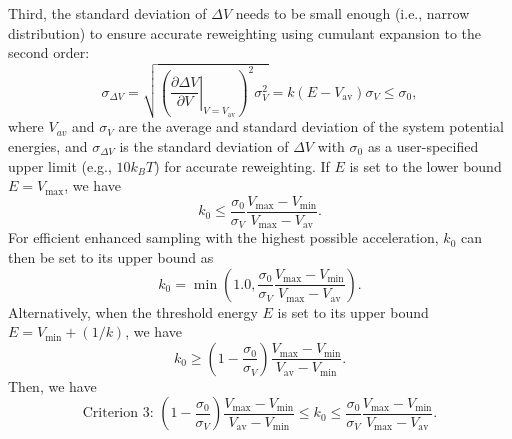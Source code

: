 Third, the standard deviation of $\Delta V$ needs to be small enough (i.e., narrow distribution) to ensure accurate reweighting using cumulant expansion to the second order:\cite{MiaoJCTC2014}
\begin{equation}
	\sigma_{\Delta V}=\sqrt{\left(\left.\frac{\partial \Delta V}{\partial V}\right|_{V=V_{\mathrm{av}}}\right)^{2} \sigma_{V}^{2}}=k\left(E-V_{\mathrm{av}}\right) \sigma_{V} \leq \sigma_{0},
\end{equation}
where $V_{av}$ and $\sigma_{V}$ are the average and standard deviation of the system potential energies, and $\sigma_{\Delta V}$ is the standard deviation of $\Delta V$ with $\sigma_{0}$ as a user-specified upper limit (e.g., $10k_BT$) for accurate reweighting. If $E$ is set to the lower bound $E=V_{\mathrm{max}}$, we have
\begin{equation}
	k_{0} \leq \frac{\sigma_{0}}{\sigma_{V}} \frac{V_{\max }-V_{\min }}{V_{\max }-V_{\mathrm{av}}}.
\end{equation}
For efficient enhanced sampling with the highest possible acceleration, $k_0$ can then be set to its upper bound as
\begin{equation}
	k_{0}=\min \left(1.0, \frac{\sigma_{0}}{\sigma_{V}} \frac{V_{\max }-V_{\min }}{V_{\max }-V_{\mathrm{av}}}\right).
\end{equation}
Alternatively, when the threshold energy $E$ is set to its upper bound $E = V_{\mathrm{min}} + (1/k)$, we have
\begin{equation}
	k_{0} \geq\left(1-\frac{\sigma_{0}}{\sigma_{V}}\right) \frac{V_{\max }-V_{\min }}{V_{\mathrm{av}}-V_{\min }}.
\end{equation}
Then, we have
\begin{equation}
	\text{Criterion 3: } \left(1-\frac{\sigma_{0}}{\sigma_{V}}\right) \frac{V_{\max }-V_{\min }}{V_{\mathrm{av}}-V_{\min }} \leq k_0 \leq \frac{\sigma_{0}}{\sigma_{V}} \frac{V_{\max }-V_{\min }}{V_{\max }-V_{\mathrm{av}}}.
\end{equation}